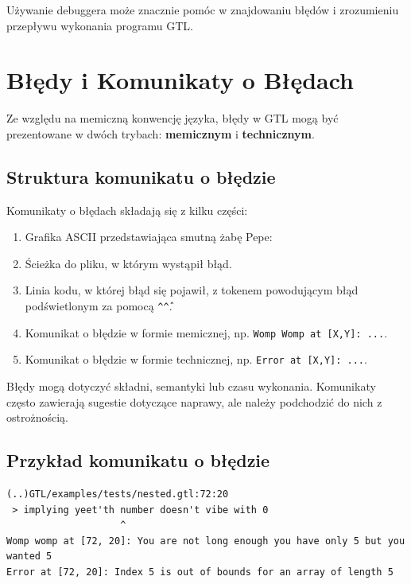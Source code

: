 \documentclass[12pt,a4paper]{article}
\begin{document}
Używanie debuggera może znacznie pomóc w znajdowaniu błędów i zrozumieniu przepływu wykonania programu GTL.

\section{Błędy i Komunikaty o Błędach}
\label{app:errors}
Ze względu na memiczną konwencję języka, błędy w GTL mogą być prezentowane w dwóch trybach: \textbf{memicznym} i \textbf{technicznym}.

\subsection{Struktura komunikatu o błędzie}
Komunikaty o błędach składają się z kilku części:
\begin{enumerate}
    \item Grafika ASCII przedstawiająca smutną żabę Pepe:\\
    \item Ścieżka do pliku, w którym wystąpił błąd.
    \item Linia kodu, w której błąd się pojawił, z tokenem powodującym błąd podświetlonym za pomocą \texttt{\^{}\^\^}.
    \item Komunikat o błędzie w formie memicznej, np. \texttt{Womp Womp at [X,Y]: ...}.
    \item Komunikat o błędzie w formie technicznej, np. \texttt{Error at [X,Y]: ...}.
\end{enumerate}
Błędy mogą dotyczyć składni, semantyki lub czasu wykonania. Komunikaty często zawierają sugestie dotyczące naprawy, ale należy podchodzić do nich z ostrożnością.

\subsection{Przykład komunikatu o błędzie}
\begin{verbatim}
(..)GTL/examples/tests/nested.gtl:72:20
 > implying yeet'th number doesn't vibe with 0
                    ^
Womp womp at [72, 20]: You are not long enough you have only 5 but you wanted 5
Error at [72, 20]: Index 5 is out of bounds for an array of length 5
\end{verbatim}
\end{document}
